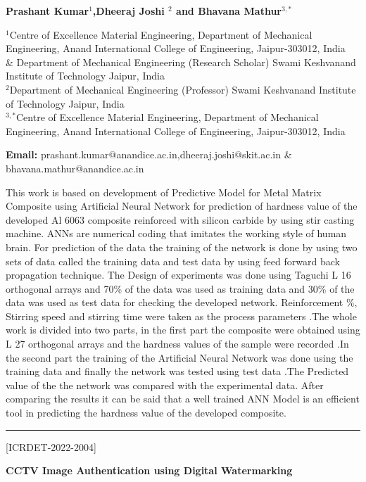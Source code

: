\documentclass[twoside,11pt]{amsart}
\begin{document}
\centerline{\textbf{Prashant Kumar$^{1}$,Dheeraj Joshi
$^{2}$ and Bhavana Mathur$^{3,*}$  }}
\vskip 2mm
\newpage
\vskip 2mm
\begin{flushleft}
$^{1}$Centre of Excellence Material Engineering, Department of Mechanical Engineering, Anand International College of Engineering, Jaipur-303012, India \\\& Department of Mechanical Engineering (Research Scholar) Swami Keshvanand Institute of Technology Jaipur, India\\
$^{2}$Department of Mechanical Engineering (Professor) Swami Keshvanand Institute of Technology Jaipur, India\\
$^{3,*}$Centre of Excellence Material Engineering, Department of Mechanical Engineering, Anand International College of Engineering, Jaipur-303012, India
\vskip 5mm
\end{flushleft}
\vskip 2mm
\begin{flushleft}
{\bf Email:} prashant.kumar@anandice.ac.in,dheeraj.joshi@skit.ac.in \& bhavana.mathur@anandice.ac.in
\end{flushleft}
\vskip 5mm
This work is based on development of Predictive Model for Metal Matrix Composite using Artificial Neural Network for prediction of hardness value of the developed Al 6063 composite reinforced with silicon carbide by using stir casting machine. ANNs are numerical coding that imitates the working style of human brain. For prediction of the data the training of the network is done by using two sets of data called the training data and test data by using feed forward back propagation technique. The Design of experiments was done using Taguchi L 16 orthogonal arrays and 70\% of the data was used as training data and 30\% of the data was used as test data for checking the developed network. Reinforcement \%, Stirring speed and stirring time were taken as the process parameters .The whole work is divided into two parts, in the first part the composite were obtained using L 27 orthogonal arrays and the hardness values of the sample were recorded .In the second part the training of the Artificial Neural Network was done using the training data and finally the network was tested using test data .The Predicted value of the the network was compared with the experimental data. After comparing the results it can be said that a well trained ANN Model is an efficient tool in predicting the hardness value of the developed composite.
\vskip 2mm
\rule{\textwidth}{0.5pt}
\vskip 5mm
\begin{flushleft}
\centerline{[ICRDET-2022-2004]}
\end{flushleft}
\begin{center}\bf\LARGE
CCTV Image Authentication using Digital Watermarking
\end{center}
\vskip 5mm
\end{document}
